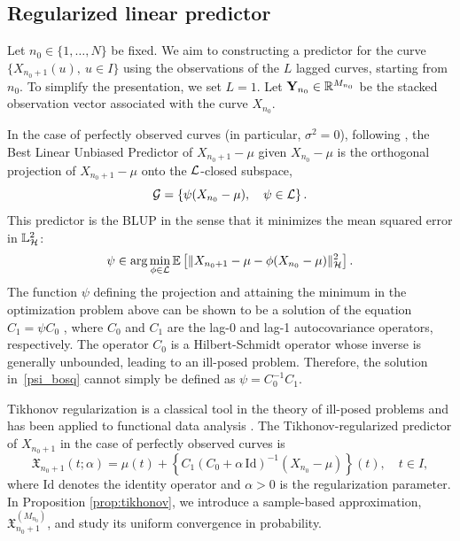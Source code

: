 \documentclass{article}
\begin{document}

\subsection{Regularized linear predictor}

Let $n_0 \in \{1, \ldots, N\}$ be fixed. We aim to constructing a predictor for the curve $\{X_{n_0+1}(u),\ u \in I\}$ using the observations of the $L$ lagged curves, starting from $n_0$. 
To simplify the presentation, we set $L=1$.
Let  $ \mathbf{Y}_{n_0}\in\mathbb{R}^{M_{n_0}} $ be the stacked observation vector associated with the curve $X_{n_0}$.






In the case of perfectly observed curves (in particular, $\sigma^2=0$), following \citet[Section 1.6]{bosq2000linear}, the Best Linear Unbiased Predictor of $X_{n_0+1}-\mu$ given $X_{n_0}-\mu$ is the orthogonal projection of $X_{n_0+1}-\mu$ onto the $\mathcal{L}$-closed subspace,
$$
\mathcal{G}=\left\{\psi(X_{n_0}-\mu),\quad \psi\in\mathcal{L}\right\}.
$$ 
This predictor is the BLUP in the sense that it minimizes the mean squared error in $\mathbb{L}^2_{\mathcal{H}}$:
\begin{equation}\label{psi_bosq}
\psi \in \arg\min_{\phi\in\mathcal{L}} \mathbb{E}\left[ \| X_{n_0+1} - \mu - \phi (X_{n_0}-\mu)\|^2_{\mathcal{H}}\right].
\end{equation}
The function $\psi$ defining the projection and attaining the minimum in the optimization problem above can be shown to be a solution of the equation $C_1=\psi C_0$ \citep[Section 3.2]{hormann2012functional},
where $C_0$ and $C_1$ are  the lag-0 and lag-1  autocovariance  operators, respectively.
The operator $C_0$ is a Hilbert-Schmidt operator whose inverse is
generally unbounded, leading to an ill-posed problem. Therefore, the solution in~\eqref{psi_bosq} cannot simply be defined as $\psi = C_0^{-1}C_1$.

Tikhonov regularization is a classical tool in the theory of ill-posed
problems and has been applied to functional data analysis
\citep[and references therein]{zhao2026functional}.
The Tikhonov-regularized predictor of $X_{n_0+1}$ in the case of perfectly observed
curves is
\begin{equation}\label{formula_tik_th}
\mathfrak{X}_{n_0+1}(t;\alpha) = \mu(t)
+ \left\{C_1(C_0+\alpha\,\mathrm{Id})^{-1}(X_{n_0}-\mu)\right\}(t),\quad t\in I,
\end{equation}
where $\mathrm{Id}$ denotes the identity operator and $\alpha>0$ is the regularization parameter. In Proposition \ref{prop:tikhonov}, we introduce a sample-based approximation, $\mathfrak{X}^{(M_{n_0})}_{n_0+1} $, and  study its uniform convergence in probability. 
\end{document}
